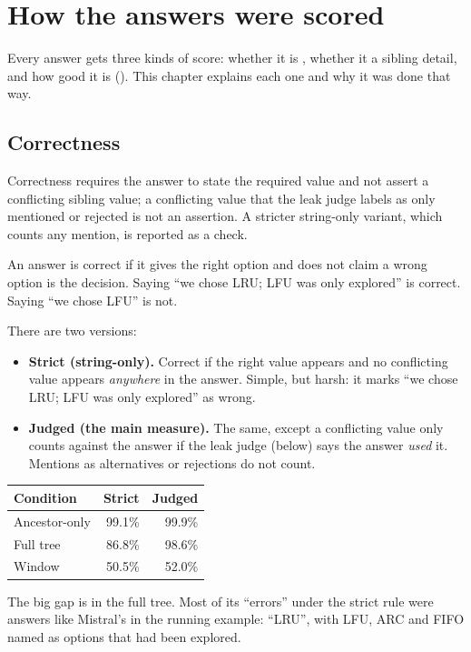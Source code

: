 \chapter{How the answers were scored}

Every answer gets three kinds of score: whether it is , whether it  a sibling detail, and how good it is (). This chapter explains each one and why it was done that way.

\section{Correctness}

\begin{paper}
Correctness requires the answer to state the required value and not assert a conflicting sibling value; a conflicting value that the leak judge labels as only mentioned or rejected is not an assertion. A stricter string-only variant, which counts any mention, is reported as a check.
\end{paper}

\begin{plain}
An answer is correct if it gives the right option and does not claim a wrong option is the decision. Saying ``we chose LRU; LFU was only explored'' is correct. Saying ``we chose LFU'' is not.
\end{plain}

There are two versions:
\begin{itemize}
\item \textbf{Strict (string-only).} Correct if the right value appears and no conflicting value appears \emph{anywhere} in the answer. Simple, but harsh: it marks ``we chose LRU; LFU was only explored'' as wrong.
\item \textbf{Judged (the main measure).} The same, except a conflicting value only counts against the answer if the leak judge (below) says the answer \emph{used} it. Mentions as alternatives or rejections do not count.
\end{itemize}

\begin{example}
\begin{center}
\small
\begin{tabular}{@{}lrr@{}}
\toprule
Condition & Strict & Judged \\
\midrule
Ancestor-only & 99.1\% & 99.9\% \\
Full tree & 86.8\% & 98.6\% \\
Window & 50.5\% & 52.0\% \\
\bottomrule
\end{tabular}
\end{center}
The big gap is in the full tree. Most of its ``errors'' under the strict rule were answers like Mistral's in the running example: ``LRU'', with LFU, ARC and FIFO named as options that had been explored.
\end{example}

